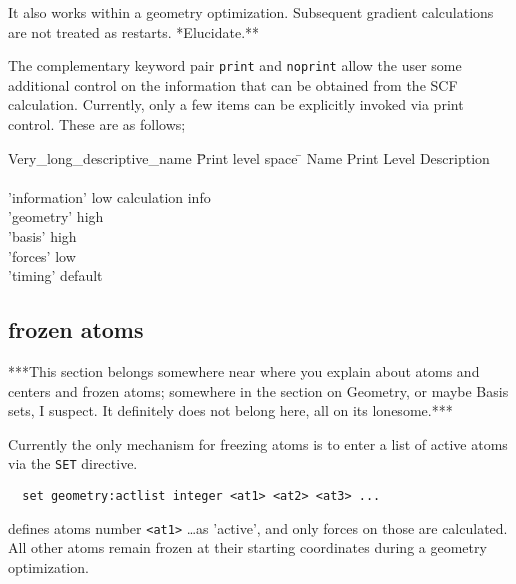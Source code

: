 
  It also works within a geometry optimization. Subsequent gradient 
  calculations are not treated as restarts.
\Large  **Elucidate.**
\normalsize


The complementary keyword pair \verb+print+ and \verb+noprint+ allow the 
user some additional control on the information that can be obtained from
the SCF calculation.  Currently, only a few items can be explicitly invoked
via print control.  These are as follows;
 

\begin{tabbing}
  Very\_long\_descriptive\_name \= Print level space \= \kill
  Name                   \> Print Level \> Description \\
                         \>        \> \\
        'information'   \>        low  \> calculation info\\
        'geometry'    \>          high \> \\
        'basis'        \>         high \> \\
        'forces'   \>             low \> \\
        'timing'   \>             default \> 
\end{tabbing}

\subsection{frozen atoms}
\label{sec:activeatoms}

\Large
***This section belongs somewhere near where you explain about atoms
and centers and frozen atoms; somewhere in the section on Geometry,
or maybe Basis sets, I suspect.  It definitely does not belong here,
all on its lonesome.***
\normalsize

Currently the only mechanism for freezing atoms is to enter a list of
active atoms via the \verb+SET+ directive.

\begin{verbatim}
  set geometry:actlist integer <at1> <at2> <at3> ...
\end{verbatim}
defines atoms number \verb+<at1>+ \ldots as 'active', and only forces
on those are calculated. All other atoms remain frozen at their
starting coordinates during a geometry optimization.

